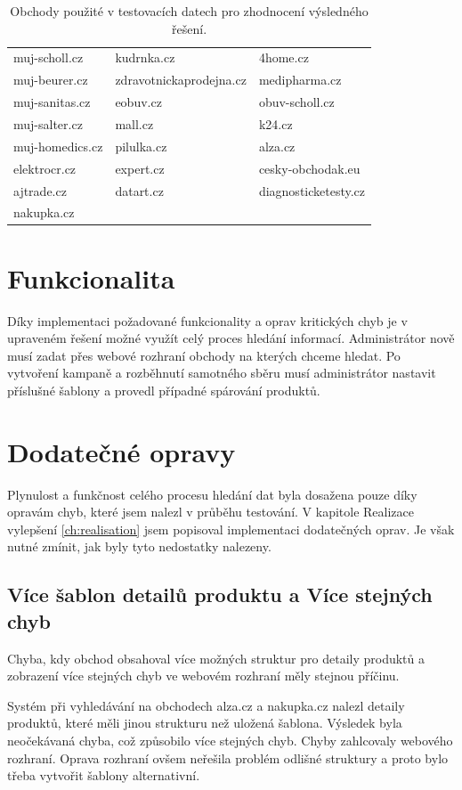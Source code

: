 \documentclass[thesis=B,czech]{FITthesis}[2012/06/26]
\begin{document}
\begin{table}
\centering
\begin{tabular}{ | l | l | l |}
\toprule
muj-scholl.cz & kudrnka.cz & 4home.cz \\
muj-beurer.cz & zdravotnickaprodejna.cz & medipharma.cz \\
muj-sanitas.cz & eobuv.cz & obuv-scholl.cz \\
muj-salter.cz & mall.cz & k24.cz \\
muj-homedics.cz & pilulka.cz & alza.cz \\
elektrocr.cz & expert.cz & cesky-obchodak.eu \\
ajtrade.cz & datart.cz & diagnosticketesty.cz \\
nakupka.cz & & \\ \bottomrule
\end{tabular}
\caption{Obchody použité v testovacích datech pro zhodnocení výsledného řešení.}
\label{table:product-test-products}
\end{table}

\section{Funkcionalita}
Díky implementaci požadované funkcionality a oprav kritických chyb je v upraveném řešení možné využít celý proces hledání informací.
Administrátor nově musí zadat přes webové rozhraní obchody na kterých chceme hledat. Po vytvoření kampaně a rozběhnutí samotného sběru
musí administrátor nastavit příslušné šablony a provedl případné spárování produktů.

\section{Dodatečné opravy}
Plynulost a funkčnost celého procesu hledání dat byla dosažena pouze díky opravám chyb, které jsem nalezl v průběhu testování.
V kapitole Realizace vylepšení \ref{ch:realisation} jsem popisoval implementaci dodatečných oprav. Je však nutné zmínit, jak byly tyto nedostatky nalezeny.

\subsection{Více šablon detailů produktu a Více stejných chyb}
Chyba, kdy obchod obsahoval více možných struktur pro detaily produktů a zobrazení více stejných chyb ve webovém rozhraní měly stejnou příčinu.
\par
Systém při vyhledávání na obchodech alza.cz a nakupka.cz nalezl detaily produktů, které měli jinou strukturu než uložená šablona.
Výsledek byla neočekávaná chyba, což způsobilo více stejných chyb. Chyby zahlcovaly webového rozhraní. Oprava rozhraní ovšem neřešila
problém odlišné struktury a proto bylo třeba vytvořit šablony alternativní.
\end{document}

